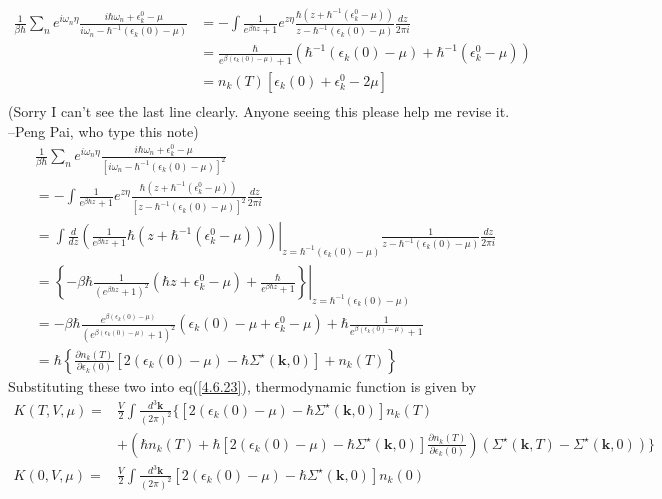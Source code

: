 \[
\begin{aligned}
\frac{1}{\beta\hbar} \sum_n e^{i\omega_n \eta} \frac{i\hbar \omega_n+\epsilon_k^0-\mu}{i\omega_n-\hbar^{-1}(\epsilon_k(0)-\mu)}
&=-\int\frac{1}{e^{\beta\hbar z}+1} e^{z\eta}  \frac{\hbar(z+\hbar^{-1}(\epsilon_k^0-\mu))}{z-\hbar^{-1}(\epsilon_k(0)-\mu)} \frac{dz}{2\pi i}\\
&=\frac{\hbar}{e^{\beta(\epsilon_k(0) -\mu)}+1} \left(\hbar^{-1}(\epsilon_k(0)-\mu)+\hbar^{-1}(\epsilon_k^0-\mu) \right)\\
&=n_k(T) \left[ \epsilon_k(0)+\epsilon_k^0-2\mu\right]\\
\end{aligned}
\]
(Sorry I can't see the last line clearly. Anyone seeing this please help me revise it. --Peng Pai, who type this note)
\[
\begin{aligned}
&\frac{1}{\beta\hbar} \sum_n e^{i\omega_n \eta} \frac{i\hbar \omega_n+\epsilon_k^0-\mu}{\left[ i\omega_n-\hbar^{-1}(\epsilon_k(0)-\mu)\right]^2}\\
&=-\int\frac{1}{e^{\beta\hbar z}+1} e^{z\eta}  \frac{\hbar(z+\hbar^{-1}(\epsilon_k^0-\mu))}{\left[ z-\hbar^{-1}(\epsilon_k(0)-\mu)\right]^2} \frac{dz}{2\pi i}\\
&=\int \frac{d}{dz}\left. \left( \frac{1}{e^{\beta\hbar z}+1} \hbar(z+\hbar^{-1}(\epsilon_k^0-\mu)) \right) \right|_{z=\hbar^{-1}(\epsilon_k(0)-\mu) }
 \frac{1}{z-\hbar^{-1}(\epsilon_k(0)-\mu)} \frac{dz}{2\pi i}\\
 &=\left. \left\{ -\beta\hbar \frac{1}{\left( e^{\beta\hbar z}+1\right)^2} (\hbar z+\epsilon_k^0-\mu) + \frac{\hbar}{e^{\beta\hbar z}+1}  \right\} \right|_{z=\hbar^{-1}(\epsilon_k(0)-\mu) }\\
 &= -\beta\hbar \frac{e^{\beta(\epsilon_k(0)-\mu)}}{\left( e^{\beta(\epsilon_k(0)-\mu)}+1\right)^2}  (\epsilon_k(0)-\mu+\epsilon_k^0 -\mu)
 	+\hbar  \frac{1}{ e^{\beta(\epsilon_k(0)-\mu)}+1} \\
&=\hbar\left\{ \frac{\partial n_k(T)}{\partial \epsilon_k(0)}  \left[  2(\epsilon_k(0)-\mu) -\hbar \Sigma^\star(\mathbf{k},0) \right] +n_k(T)  \right\}
\end{aligned}
\]
Substituting these two into eq(\ref{4.6.23}), thermodynamic function is given by
\[
\begin{aligned}
K(T,V,\mu)=&\frac{V}{2}\int \frac{d^3 \mathbf{k}}{(2\pi)^2} \Big\{ \left[ 2(\epsilon_k(0)-\mu)-\hbar \Sigma^\star (\mathbf{k},0) \right] n_k(T) \\
&+\left( \hbar n_k(T) +\hbar \left[ 2(\epsilon_k(0)-\mu)-\hbar \Sigma^\star (\mathbf{k},0) \right] \frac{\partial n_k(T)}{\partial \epsilon_k(0)} \right)(\Sigma^\star (\mathbf{k},T) -\Sigma^\star (\mathbf{k},0) ) \Big\}\\
K(0,V,\mu)=&\frac{V}{2}\int \frac{d^3 \mathbf{k}}{(2\pi)^2} \left[ 2(\epsilon_k(0)-\mu)-\hbar \Sigma^\star (\mathbf{k},0) \right] n_k(0)
\end{aligned}
\]

